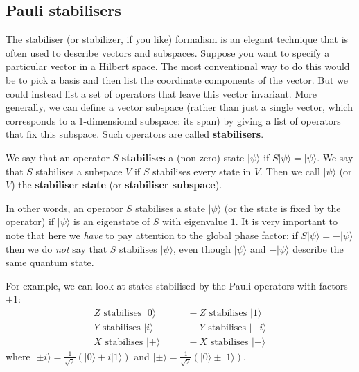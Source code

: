 \documentclass[fleqn,a4paper]{article}
\newenvironment{idea}{\everypar{\setlength{\parindent}{1.5em}}}{}
\theoremstyle{definition}
\theoremstyle{definition}
\theoremstyle{definition}
\theoremstyle{definition}
\theoremstyle{remark}
\begin{document}
\hypertarget{pauli-stabilisers}{%
\subsection{Pauli stabilisers}\label{pauli-stabilisers}}

The stabiliser (or stabilizer, if you like) formalism is an elegant technique that is often used to describe vectors and subspaces.
Suppose you want to specify a particular vector in a Hilbert space.
The most conventional way to do this would be to pick a basis and then list the coordinate components of the vector.
But we could instead list a set of operators that leave this vector invariant.
More generally, we can define a vector subspace (rather than just a single vector, which corresponds to a 1-dimensional subspace: its span) by giving a list of operators that fix this subspace.
Such operators are called \textbf{stabilisers}.

\begin{idea}
We say that an operator \(S\) \textbf{stabilises} a (non-zero) state \(|\psi\rangle\) if \(S|\psi\rangle=|\psi\rangle\).
We say that \(S\) stabilises a subspace \(V\) if \(S\) stabilises every state in \(V\).
Then we call \(|\psi\rangle\) (or \(V\)) the \textbf{stabiliser state} (or \textbf{stabiliser subspace}).

\end{idea}

In other words, an operator \(S\) stabilises a state \(|\psi\rangle\) (or the state is fixed by the operator) if \(|\psi\rangle\) is an eigenstate of \(S\) with eigenvalue \(1\).
It is very important to note that here we \emph{have} to pay attention to the global phase factor: if \(S|\psi\rangle=-|\psi\rangle\) then we do \emph{not} say that \(S\) stabilises \(|\psi\rangle\), even though \(|\psi\rangle\) and \(-|\psi\rangle\) describe the same quantum state.

For example, we can look at states stabilised by the Pauli operators with factors \(\pm1\):
\[
  \begin{aligned}
    Z\text{ stabilises }|0\rangle
    &\qquad-Z\text{ stabilises }|1\rangle
  \\Y\text{ stabilises }|i\rangle
    &\qquad-Y\text{ stabilises }|-i\rangle
  \\X\text{ stabilises }|+\rangle
    &\qquad-X\text{ stabilises }|-\rangle
  \end{aligned}
\]
where \(|\pm i\rangle=\frac{1}{\sqrt{2}}(|0\rangle+i|1\rangle)\) and \(|\pm\rangle=\frac{1}{\sqrt{2}}(|0\rangle\pm|1\rangle)\).
\end{document}

